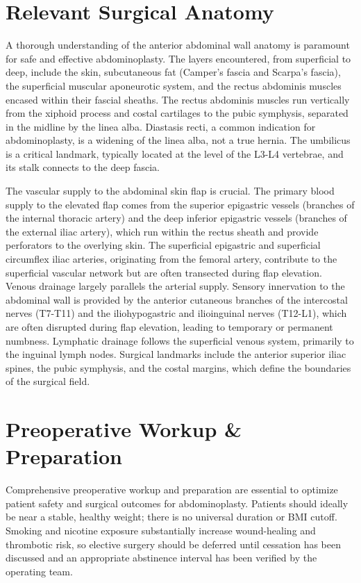 \section*{Relevant Surgical Anatomy}
A thorough understanding of the anterior abdominal wall anatomy is paramount for safe and effective abdominoplasty. The layers encountered, from superficial to deep, include the skin, subcutaneous fat (Camper's fascia and Scarpa's fascia), the superficial muscular aponeurotic system, and the rectus abdominis muscles encased within their fascial sheaths. The rectus abdominis muscles run vertically from the xiphoid process and costal cartilages to the pubic symphysis, separated in the midline by the linea alba. Diastasis recti, a common indication for abdominoplasty, is a widening of the linea alba, not a true hernia. The umbilicus is a critical landmark, typically located at the level of the L3-L4 vertebrae, and its stalk connects to the deep fascia.

The vascular supply to the abdominal skin flap is crucial. The primary blood supply to the elevated flap comes from the superior epigastric vessels (branches of the internal thoracic artery) and the deep inferior epigastric vessels (branches of the external iliac artery), which run within the rectus sheath and provide perforators to the overlying skin. The superficial epigastric and superficial circumflex iliac arteries, originating from the femoral artery, contribute to the superficial vascular network but are often transected during flap elevation. Venous drainage largely parallels the arterial supply. Sensory innervation to the abdominal wall is provided by the anterior cutaneous branches of the intercostal nerves (T7-T11) and the iliohypogastric and ilioinguinal nerves (T12-L1), which are often disrupted during flap elevation, leading to temporary or permanent numbness. Lymphatic drainage follows the superficial venous system, primarily to the inguinal lymph nodes. Surgical landmarks include the anterior superior iliac spines, the pubic symphysis, and the costal margins, which define the boundaries of the surgical field.

\section*{Preoperative Workup \& Preparation}
Comprehensive preoperative workup and preparation are essential to optimize patient safety and surgical outcomes for abdominoplasty. Patients should ideally be near a stable, healthy weight; there is no universal duration or BMI cutoff. Smoking and nicotine exposure substantially increase wound-healing and thrombotic risk, so elective surgery should be deferred until cessation has been discussed and an appropriate abstinence interval has been verified by the operating team.

